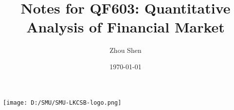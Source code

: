 \documentclass[en,hazy,normal,blue,14pt]{elegantnote}
\title{Notes for QF603: Quantitative Analysis of Financial Market}
\author{Zhou Shen}
\institute{Singapore Management University}
\date{\today}
\begin{document}
\maketitle
\centerline{\texttt{[image: D:/SMU/SMU-LKCSB-logo.png]}}
\newpage










\end{document}
